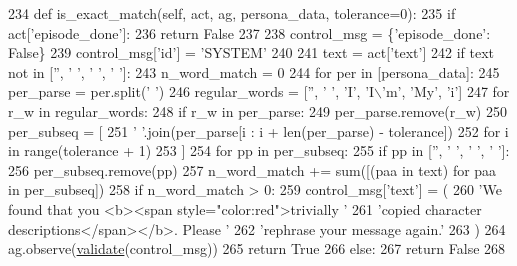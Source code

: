 \begin{DoxyCode}
234     \textcolor{keyword}{def }is\_exact\_match(self, act, ag, persona\_data, tolerance=0):
235         \textcolor{keywordflow}{if} act[\textcolor{stringliteral}{'episode\_done'}]:
236             \textcolor{keywordflow}{return} \textcolor{keyword}{False}
237 
238         control\_msg = \{\textcolor{stringliteral}{'episode\_done'}: \textcolor{keyword}{False}\}
239         control\_msg[\textcolor{stringliteral}{'id'}] = \textcolor{stringliteral}{'SYSTEM'}
240 
241         text = act[\textcolor{stringliteral}{'text'}]
242         \textcolor{keywordflow}{if} text \textcolor{keywordflow}{not} \textcolor{keywordflow}{in} [\textcolor{stringliteral}{''}, \textcolor{stringliteral}{' '}, \textcolor{stringliteral}{'  '}, \textcolor{stringliteral}{'   '}]:
243             n\_word\_match = 0
244             \textcolor{keywordflow}{for} per \textcolor{keywordflow}{in} [persona\_data]:
245                 per\_parse = per.split(\textcolor{stringliteral}{' '})
246                 regular\_words = [\textcolor{stringliteral}{''}, \textcolor{stringliteral}{' '}, \textcolor{stringliteral}{'I'}, \textcolor{stringliteral}{'I\(\backslash\)'m'}, \textcolor{stringliteral}{'My'}, \textcolor{stringliteral}{'i'}]
247                 \textcolor{keywordflow}{for} r\_w \textcolor{keywordflow}{in} regular\_words:
248                     \textcolor{keywordflow}{if} r\_w \textcolor{keywordflow}{in} per\_parse:
249                         per\_parse.remove(r\_w)
250                 per\_subseq = [
251                     \textcolor{stringliteral}{' '}.join(per\_parse[i : i + len(per\_parse) - tolerance])
252                     \textcolor{keywordflow}{for} i \textcolor{keywordflow}{in} range(tolerance + 1)
253                 ]
254                 \textcolor{keywordflow}{for} pp \textcolor{keywordflow}{in} per\_subseq:
255                     \textcolor{keywordflow}{if} pp \textcolor{keywordflow}{in} [\textcolor{stringliteral}{''}, \textcolor{stringliteral}{' '}, \textcolor{stringliteral}{'  '}, \textcolor{stringliteral}{'   '}]:
256                         per\_subseq.remove(pp)
257                 n\_word\_match += sum([(paa \textcolor{keywordflow}{in} text) \textcolor{keywordflow}{for} paa \textcolor{keywordflow}{in} per\_subseq])
258             \textcolor{keywordflow}{if} n\_word\_match > 0:
259                 control\_msg[\textcolor{stringliteral}{'text'}] = (
260                     \textcolor{stringliteral}{'We found that you <b><span style="color:red">trivially '}
261                     \textcolor{stringliteral}{'copied character descriptions</span></b>. Please '}
262                     \textcolor{stringliteral}{'rephrase your message again.'}
263                 )
264                 ag.observe(\hyperlink{namespaceparlai_1_1core_1_1worlds_afc3fad603b7bce41dbdc9cdc04a9c794}{validate}(control\_msg))
265                 \textcolor{keywordflow}{return} \textcolor{keyword}{True}
266             \textcolor{keywordflow}{else}:
267                 \textcolor{keywordflow}{return} \textcolor{keyword}{False}
268 
\end{DoxyCode}
